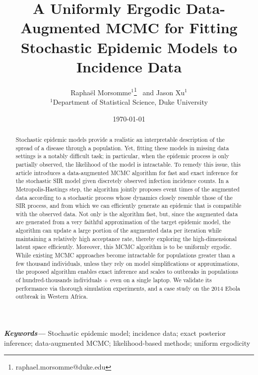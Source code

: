 \documentclass[11pt]{article}
\begin{document}
		
	\providecommand{\keywords}[1]
	{
		\small	
		\textbf{\textit{Keywords---}} #1
	}
	
	
	\title{%
	A Uniformly Ergodic Data-Augmented MCMC for Fitting Stochastic Epidemic Models to Incidence Data
	}
	\author{Rapha\"{e}l Morsomme$^{1}$\footnote{raphael.morsomme@duke.edu} \ and Jason Xu$^{1}$ \\
	\small $^{1}$Department of Statistical Science, Duke University \\
	}
	\date{\today}	
	\maketitle
	
	\begin{abstract}
		Stochastic epidemic models provide a realistic an interpretable description of the spread of a disease through a population. Yet, fitting these models in missing data settings is a notably difficult task; in particular, when the epidemic process is only partially observed, the likelihood of the model is intractable. To remedy this issue, this article introduces a data-augmented MCMC algorithm for fast and exact inference for the stochastic SIR model given discretely observed infection incidence counts. In a Metropolis-Hastings step, the algorithm jointly proposes event times of the augmented data according to a stochastic process whose dynamics closely resemble those of the SIR process, and from which we can efficiently generate an epidemic that is compatible with the observed data. Not only is the algorithm fast, but, since the augmented data are generated from a very faithful approximation of the target epidemic model, the algorithm can update a large portion of the augmented data per iteration while maintaining a relatively high acceptance rate, thereby exploring the high-dimensional latent space efficiently. Moreover, this MCMC algorithm is to be uniformly ergodic. While existing MCMC approaches become intractable for populations greater than a few thousand individuals, unless they rely on model simplifications or approximations, the proposed algorithm enables exact inference and scales to outbreaks in populations of hundred-thousands individuals
		+ even on a single laptop. We validate its performance via thorough simulation experiments, and a case study on the $2014$ Ebola outbreak in Western Africa. %
	\end{abstract}
	\keywords{Stochastic epidemic model; incidence data; exact posterior inference; data-augmented MCMC; likelihood-based methods; uniform ergodicity}
	
\end{document}
